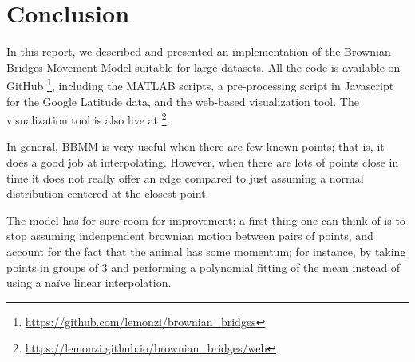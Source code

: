 \documentclass[12pt]{article}
\begin{document}
\section{Conclusion}

In this report, we described and presented an implementation of the Brownian Bridges Movement Model suitable for large datasets. All the code is available on GitHub \footnote{\url{https://github.com/lemonzi/brownian_bridges}}, including the MATLAB scripts, a pre-processing script in Javascript for the Google Latitude data, and the web-based visualization tool. The visualization tool is also live at \footnote{\url{https://lemonzi.github.io/brownian_bridges/web}}.

In general, BBMM is very useful when there are few known points; that is, it does a good job at interpolating. However, when there are lots of points close in time it does not really offer an edge compared to just assuming a normal distribution centered at the closest point.

The model has for sure room for improvement; a first thing one can think of is to stop assuming indenpendent brownian motion between pairs of points, and account for the fact that the animal has some momentum; for instance, by taking points in groups of 3 and performing a polynomial fitting of the mean instead of using a naïve linear interpolation.

\end{document}
